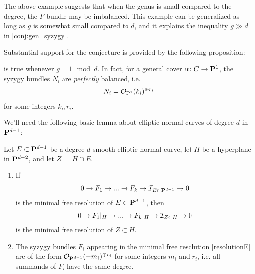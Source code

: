 \documentclass[11pt, two side, letterpaper, final]{amsart}
\renewcommand{\P}{{\bf P}}
\newcommand {\from}{\colon}
\newcommand{\cO}{\mathcal{O}}
\begin{document}
The above example suggests that when the genus is small compared to the degree, the $F$-bundle may be imbalanced. This example can be generalized as long as $g$ is somewhat small compared to $d$, and it explains the inequality $g \gg d$ in 
\cref{conj:gen_syzygy}. 

Substantial support for the conjecture is provided by the following proposition: 

\begin{proposition}\label{prop:dkcurves}
 is true whenever $g = 1 \mod d$. In fact, for a general cover $\alpha \from C \to \P^{1}$, the syzygy bundles $N_{i}$ are \emph{perfectly} balanced, i.e. \[N_{i} = \cO_{\P^{1}}(k_{i})^{\oplus r_{i}}\] for some integers $k_{i}, r_{i}$.
\end{proposition}

We'll need the following basic lemma about elliptic normal curves of degree $d$ in $\P^{d-1}$:
\begin{lemma}\label{lem:ellipticnormal}
Let $E \subset \P^{d-1}$ be a degree $d$ smooth elliptic normal curve, let $H$ be a hyperplane in $\P^{d-2}$, and let $Z := H \cap E$.  
\begin{enumerate}[label=(\alph*)]
\item If 
\begin{equation}\label{resolutionE}
0 \to F_{1} \to ... \to F_{k}\to {\sh I}_{E \subset \P^{d-1}} \to 0
\end{equation}
is the minimal free resolution of $E \subset \P^{d-1}$, then 
\[0 \to F_{1}|_{H} \to ... \to F_{k}|_{H} \to  {{\mathcal I}}_{Z \subset H} \to 0\] is the minimal free resolution of $Z \subset H$. 
\item The syzygy bundles $F_{i}$ appearing in the minimal free resolution \eqref{resolutionE} are of the form $\cO_{\P^{d-1}}(-m_{i})^{\oplus r_{i}}$ for some integers $m_{i}$ and $r_{i}$, i.e. all summands of $F_{i}$ have the same degree.
\end{enumerate}

\end{lemma}
\end{document}
